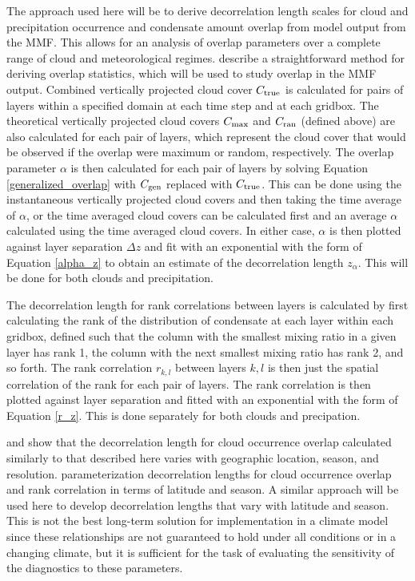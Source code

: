 \documentclass[letter]{article}
\begin{document}
The approach used here will be to derive decorrelation length scales for cloud and precipitation occurrence and condensate amount overlap from model output from the MMF. This allows for an analysis of overlap parameters over a complete range of cloud and meteorological regimes. \cite{pincus_et_al_2005} describe a straightforward method for deriving overlap statistics, which will be used to study overlap in the MMF output. Combined vertically projected cloud cover $C_{\rm true}$ is calculated for pairs of layers within a specified domain at each time step and at each gridbox. The theoretical vertically projected cloud covers $C_{\rm max}$ and $C_{\rm ran}$ (defined above) are also calculated for each pair of layers, which represent the cloud cover that would be observed if the overlap were maximum or random, respectively. The overlap parameter $\alpha$ is then calculated for each pair of layers by solving Equation \ref{generalized_overlap} with $C_{\rm gen}$ replaced with $C_{\rm true}$. This can be done using the instantaneous vertically projected cloud covers and then taking the time average of $\alpha$, or the time averaged cloud covers can be calculated first and an average $\alpha$ calculated using the time averaged cloud covers. In either case, $\alpha$ is then plotted against layer separation $\Delta z$ and fit with an exponential with the form of Equation \ref{alpha_z} to obtain an estimate of the decorrelation length $z_{\alpha}$. This will be done for both clouds and precipitation.

The decorrelation length for rank correlations between layers is calculated by first calculating the rank of the distribution of condensate at each layer within each gridbox, defined such that the column with the smallest mixing ratio in a given layer has rank 1, the column with the next smallest mixing ratio has rank 2, and so forth. The rank correlation $r_{k,l}$ between layers $k,l$ is then just the spatial correlation of the rank for each pair of layers. The rank correlation is then plotted against layer separation and fitted with an exponential with the form of Equation \ref{r_z}. This is done separately for both clouds and precipation.

\cite{mace_and_benson-troth_2002} and \cite{barker_2008} show that the decorrelation length for cloud occurrence overlap calculated similarly to that described here varies with geographic location, season, and resolution. \cite{oreopoulos_et_al_2012} parameterization decorrelation lengths for cloud occurrence overlap and rank correlation in terms of latitude and season. A similar approach will be used here to develop decorrelation lengths that vary with latitude and season. This is not the best long-term solution for implementation in a climate model since these relationships are not guaranteed to hold under all conditions or in a changing climate, but it is sufficient for the task of evaluating the sensitivity of the diagnostics to these parameters.
\end{document}
